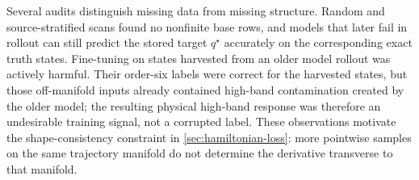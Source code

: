 Several audits distinguish missing data from missing structure.  Random and
source-stratified scans found no nonfinite base rows, and models that later
fail in rollout can still predict the stored target $q^\star$ accurately on
the corresponding exact truth states.  Fine-tuning on states harvested from an
older model rollout was actively harmful.  Their order-six labels were correct
for the harvested states,
but those off-manifold inputs already contained high-band contamination created
by the older model; the resulting physical high-band response was therefore an
undesirable training signal, not a corrupted label.  These
observations motivate the shape-consistency constraint in
\cref{sec:hamiltonian-loss}: more pointwise samples on the same trajectory
manifold do not determine the derivative transverse to that manifold.
